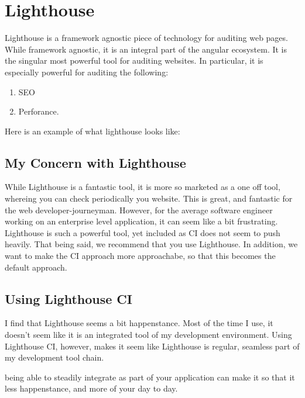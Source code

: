 \chapter{ Lighthouse }    

Lighthouse is a framework agnostic piece of technology for auditing web pages. While framework agnostic, it is an integral part of the angular ecosystem. It is the singular most powerful tool for auditing websites. In particular, it is especially powerful for auditing the following:
\begin{enumerate}
  \item SEO 
  \item Perforance.
\end{enumerate}

Here is an example of what lighthouse looks like: 

\section{My Concern with Lighthouse}
While Lighthouse is a fantastic tool, it is more so marketed as a one off tool, whereing you can check periodically you website. This is great, and fantastic for the web developer-journeyman. However, for the average software engineer working on an enterprise level application, it can seem like a bit frustrating. Lighthouse is such a powerful tool, yet included as CI does not seem to push heavily. That being said, we recommend that you use Lighthouse. In addition, we want to make the CI approach more approachabe, so that this becomes the default approach.

\section{Using Lighthouse CI}

I find that Lighthouse seems a bit happenstance. Most of the time I use, it doesn't seem like it is an integrated tool of my development environment. Using 
Lighthouse CI, however, makes it seem like Lighthouse is regular, seamless part of my development tool chain. 

being able to steadily integrate as part of your application can make it so that it less happenstance, and more of your day to day. 